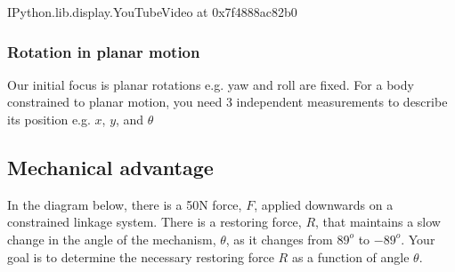 \documentclass[letterpaper,10pt,english]{sphinxmanual}
\begin{document}
\begin{sphinxVerbatim}[commandchars=\\\{\}]
   
  
\end{sphinxVerbatim}

\begin{sphinxVerbatim}[commandchars=\\\{\}]
\PYGZlt{}IPython.lib.display.YouTubeVideo at 0x7f4888ac82b0\PYGZgt{}
\end{sphinxVerbatim}


\subsubsection{Rotation in planar motion}
\label{\detokenize{module_01/kinematics:rotation-in-planar-motion}}
Our initial focus is planar rotations e.g. yaw and roll are fixed. For a
body constrained to planar motion, you need 3 independent measurements
to describe its position e.g. \(x\), \(y\), and \(\theta\)

\begin{sphinxVerbatim}[commandchars=\\\{\}]
   
   
   
\end{sphinxVerbatim}


\subsection{Mechanical advantage}
\label{\detokenize{module_01/mechanical-advantage:mechanical-advantage}}\label{\detokenize{module_01/mechanical-advantage::doc}}
In the diagram below, there is a 50\sphinxhyphen{}N force, \(F\), applied downwards on a
constrained linkage system. There is a restoring force, \(R\), that
maintains a slow change in the angle of the mechanism, \(\theta\), as it
changes from \(89^o\) to \(-89^o\). Your
goal is to determine the necessary restoring force \(R\) as a
function of angle \(\theta\).
\end{document}
